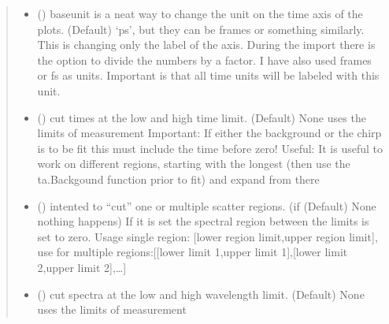\documentclass[letterpaper,10pt,english]{sphinxmanual}
\begin{document}
\begin{fulllineitems}
\begin{quote}
\begin{description}
\begin{itemize}
\item {} 
 () \textendash{} baseunit is a neat way to change the unit on the time axis of the plots. (Default) ‘ps’, but they
can be frames or something similarly. This is changing only the label of the axis.
During the import there is the option to divide the numbers by a factor.
I have also used frames or fs as units. Important is that all time units will be labeled with
this unit.

\item {} 
 (\sphinxstyleliteralemphasis{\sphinxupquote{ (}}\sphinxstyleliteralemphasis{\sphinxupquote{)}}\sphinxstyleliteralemphasis{\sphinxupquote{, }}) \textendash{} cut times at the low and high time limit. (Default) None uses the limits of measurement
Important: If either the background or the chirp is to be fit this must include the
time before zero! Useful: It is useful to work on different regions, starting with
the longest (then use the ta.Backgound function prior to fit) and expand from there

\item {} 
 (\sphinxstyleliteralemphasis{\sphinxupquote{ (}}\sphinxstyleliteralemphasis{\sphinxupquote{, }}\sphinxstyleliteralemphasis{\sphinxupquote{)}}\sphinxstyleliteralemphasis{\sphinxupquote{, }}) \textendash{} intented to “cut” one or multiple scatter regions. (if (Default) None nothing
happens) If it is set the spectral region between the limits is set to zero.
Usage single region: {[}lower region limit,upper region limit{]},
use for multiple regions:{[}{[}lower limit 1,upper limit 1{]},{[}lower limit 2,upper limit 2{]},…{]}

\item {} 
 (\sphinxstyleliteralemphasis{\sphinxupquote{ (}}\sphinxstyleliteralemphasis{\sphinxupquote{)}}\sphinxstyleliteralemphasis{\sphinxupquote{, }}) \textendash{} cut spectra at the low and high wavelength limit. (Default) None
uses the limits of measurement


\end{itemize}
\end{description}
\end{quote}
\end{fulllineitems}
\end{document}
